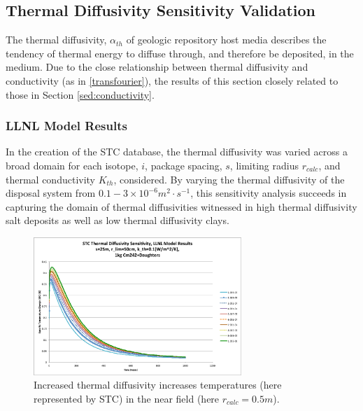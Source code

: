 \subsection{Thermal Diffusivity Sensitivity Validation}\label{sec:diffusivity}
The thermal diffusivity, $\alpha_{th}$ of geologic repository host media 
describes the tendency of thermal energy to diffuse through, and therefore be 
deposited, in the medium. Due to the close relationship between thermal 
diffusivity and conductivity (as in \eqref{transfourier}), the results of this section 
closely related to those in Section \ref{sed:conductivity}.

\FloatBarrier
\subsubsection{LLNL Model Results}

In the creation of the \gls{STC} database, the thermal diffusivity was varied 
across a broad domain for each isotope, $i$, package spacing, $s$, limiting 
radius $r_{calc}$, and thermal conductivity $K_{th}$, considered.  By 
varying the thermal diffusivity of the disposal system from $0.1-3\times 
10^{-6} m^2\cdot s^{-1}$, this sensitivity analysis succeeds in capturing the domain of 
thermal diffusivities witnessed in high thermal diffusivity salt deposits as 
well as low thermal diffusivity clays.

\begin{figure}[htbp!]
\begin{center}
\includegraphics[width=0.7\textwidth]{./chapters/demonstration/diffusivity/Cm242alpha_kth_low.eps}
\end{center}
\caption[$K_{th}$ Sensitivity to $\alpha_{th}$ for low $k_{th}$]{Increased thermal 
diffusivity increases temperatures (here represented by \gls{STC}) in the near field (here $r_{calc} = 0.5 m$).}
\label{fig:Cm242alpha_kth_low}
\end{figure}


